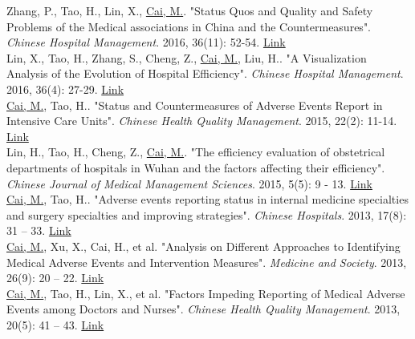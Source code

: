 \documentclass[11pt, a4paper]{article}
\newcommand{\years}[1]{\marginnote{\scriptsize #1}}
\begin{document}
\years{2016}Zhang, P., Tao, H., Lin, X., \underline{Cai, M.}. "Status Quos and Quality and Safety Problems of the Medical associations in China and the Countermeasures". \emph{Chinese Hospital Management}. 2016, 36(11): 52-54. \href{http://www.cnki.com.cn/Article/CJFDTOTAL-YYGL201611027.htm}{Link}\\
\years{2016}Lin, X., Tao, H., Zhang, S., Cheng, Z., \underline{Cai, M.}, Liu, H.. "A Visualization Analysis of the Evolution of Hospital Efficiency". \emph{Chinese Hospital Management}. 2016, 36(4): 27-29. \href{http://www.cnki.com.cn/Article/CJFDTOTAL-YYGL201604015.htm}{Link}\\
\years{2015}\underline{Cai, M.}, Tao, H.. "Status and Countermeasures of Adverse Events Report in Intensive Care Units". \emph{Chinese Health Quality Management}. 2015, 22(2): 11-14. \href{http://www.cnki.com.cn/Article/CJFDTOTAL-WSJG201502008.htm}{Link}\\
\years{2015}Lin, H., Tao, H., Cheng, Z., \underline{Cai, M.}. "The efficiency evaluation of obstetrical departments of hospitals in Wuhan and the factors affecting their efficiency". \emph{Chinese Journal of Medical Management Sciences}. 2015, 5(5): 9 - 13. \href{http://www.cnki.com.cn/Article/CJFDTOTAL-YLGL201505004.htm}{Link}\\
\years{2013}\underline{Cai, M.}, Tao, H.. "Adverse events reporting status in internal medicine specialties and surgery specialties and improving strategies". \emph{Chinese Hospitals}. 2013, 17(8): 31 – 33. \href{http://www.cnki.com.cn/Article/CJFDTOTAL-ZGYU201308016.htm}{Link}\\
\years{2013}\underline{Cai, M.}, Xu, X., Cai, H., et al. "Analysis on Different Approaches to Identifying Medical Adverse Events and Intervention Measures". \emph{Medicine and Society}. 2013, 26(9): 20 – 22. \href{http://www.cnki.com.cn/Article/CJFDTOTAL-YXSH201309007.htm}{Link}\\
\years{2013}\underline{Cai, M.}, Tao, H., Lin, X., et al. "Factors Impeding Reporting of Medical Adverse Events among Doctors and Nurses". \emph{Chinese Health Quality Management}. 2013, 20(5): 41 – 43. \href{http://www.cqvip.com/qk/98273x/201305/47221843.html}{Link}
\end{document}
